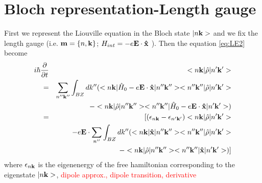 \documentclass[aps,prb,preprint]{revtex4-1}
\begin{document}
\section{Bloch representation-Length gauge}
\label{sec:BL}
First we represent the Liouville equation in the Bloch state $|n{\bf k}>$ and we fix the length gauge (i.e. ${\bf m} = \{n, {\bf k}\}$; $H_{int} =-e{\bf E} \cdot {\bf \hat{x}}$ ). 
Then the equation \ref{eq:LE2} become
\begin{eqnarray}\label{eq:BL} 
i \hbar \frac{ \partial }{\partial t } &&<n{\bf k}| \hat{\rho} |n'{\bf k'}> \nonumber \\
= && \sum_{n''{\bf k''}} \int_{BZ} dk''  ( <n{\bf k}| \hat{H}_0 -e{\bf E} \cdot {\bf \hat{x}} |n''{\bf k''}><n''{\bf k''}| \hat{\rho} |n'{\bf k'}> \nonumber  \\
&&- <n{\bf k}| \hat{\rho} |n''{\bf k''}><n''{\bf k''}| \hat{H}_0 -e{\bf E} \cdot {\bf \hat{x}}  |n'{\bf k'}> )\nonumber  \\
= && [ (\epsilon_{n{\bf k}}-\epsilon_{n'{\bf k'}}) <n{\bf k}| \hat{\rho} |n'{\bf k'}> \nonumber  \\
&&-e{\bf E} \cdot \sum_{n''}\int_{BZ} dk'' ( <n{\bf k}| {\bf \hat{x}} |n''{\bf k''}> <n''{\bf k''}| \hat{\rho} |n'{\bf k'}> \nonumber  \\
&&- <n{\bf k}| \hat{\rho} |n''{\bf k''}> <n''{\bf k''}| {\bf \hat{x}} |n'{\bf k'}> ) ]
\end{eqnarray}
where $\epsilon_{n{\bf k}}$ is the eigenenergy of the free hamiltonian corresponding to the eigenstate $|n{\bf k}>$, 
\textcolor{red}{dipole approx., dipole transition, derivative}
\end{document}
